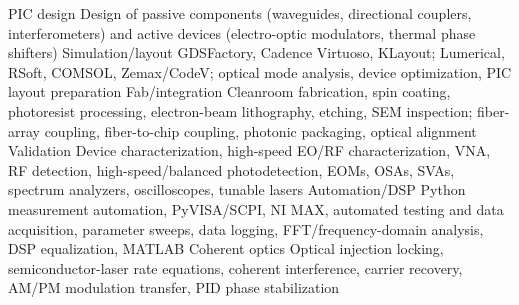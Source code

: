 
\begin{cvskills}
  \cvskill
    {PIC design}
    {Design of passive components (waveguides, directional couplers, interferometers) and active devices (electro-optic modulators, thermal phase shifters)}
  \cvskill
    {Simulation/layout}
    {GDSFactory, Cadence Virtuoso, KLayout; Lumerical, RSoft, COMSOL, Zemax/CodeV; optical mode analysis, device optimization, PIC layout preparation}
  \cvskill
    {Fab/integration}
    {Cleanroom fabrication, spin coating, photoresist processing, electron-beam lithography, etching, SEM inspection; fiber-array coupling, fiber-to-chip coupling, photonic packaging, optical alignment}
  \cvskill
    {Validation}
    {Device characterization, high-speed EO/RF characterization, VNA, RF detection, high-speed/balanced photodetection, EOMs, OSAs, SVAs, spectrum analyzers, oscilloscopes, tunable lasers}
  \cvskill
    {Automation/DSP}
    {Python measurement automation, PyVISA/SCPI, NI MAX, automated testing and data acquisition, parameter sweeps, data logging, FFT/frequency-domain analysis, DSP equalization, MATLAB}
  \cvskill
    {Coherent optics}
    {Optical injection locking, semiconductor-laser rate equations, coherent interference, carrier recovery, AM/PM modulation transfer, PID phase stabilization}
\end{cvskills}
